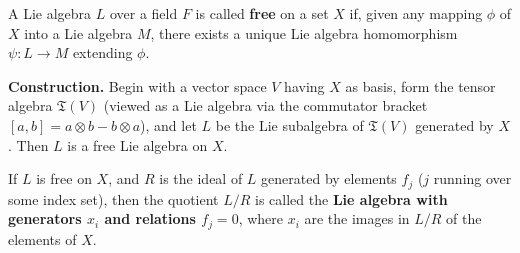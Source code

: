 A Lie algebra $L$ over a field $F$ is called \textbf{free} on a set $X$ if, given any mapping $\phi$ of $X$ into a Lie algebra $M$, there exists a unique Lie algebra homomorphism $\psi: L \to M$ extending $\phi$.

\textbf{Construction.} Begin with a vector space $V$ having $X$ as basis, form the tensor algebra $\mathfrak{T}(V)$ (viewed as a Lie algebra via the commutator bracket $[a, b] = a \otimes b - b \otimes a$), and let $L$ be the Lie subalgebra of $\mathfrak{T}(V)$ generated by $X$. Then $L$ is a free Lie algebra on $X$.

If $L$ is free on $X$, and $R$ is the ideal of $L$ generated by elements $f_j$ ($j$ running over some index set), then the quotient $L/R$ is called the \textbf{Lie algebra with generators $x_i$ and relations $f_j = 0$}, where $x_i$ are the images in $L/R$ of the elements of $X$.
